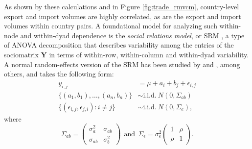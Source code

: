 \documentclass[11pt]{article}\usepackage[]{graphicx}\usepackage[]{color}
\newcommand{\bl}[1]{{\mathbf #1}}
\begin{document}
As shown by these calculations and in Figure \ref{fig:trade_rmvcm}, 
country-level export and import volumes are highly correlated, 
as are the export and import volumes within country pairs. 
A foundational model for analyzing such 
within-node and within-dyad 
 dependence is 
the \emph{social relations model}, or SRM \citep{warner_kenny_stoto_1979}, 
a type of ANOVA decomposition that describes variability among the
 entries of the sociomatrix $\bl Y$ in terms of within-row, 
within-column and within-dyad variability.  
A normal random-effects version of the SRM has been studied by 
\citet{wong_1982} and  \citet{li_loken_2002}, among others, and 
takes the following form:
\begin{align} 
y_{i,j} & = \mu+ a_i + b_j + \epsilon_{i,j} \label{eqn:srm} \\
 \{ (a_1,b_1) ,\ldots, (a_n,b_n) \} &\sim  \text{i.i.d.} \ N(0,\Sigma_{ab})\nonumber  \\
 \{ (\epsilon_{i,j},\epsilon_{j,i}) : i\neq j \} &\sim  \text{i.i.d.} \ N(0,\Sigma_{e}) ,  \nonumber
\end{align}
where 
\[ 
\Sigma_{ab} = \begin{pmatrix} \sigma^2_a & \sigma_{ab} \\ 
    \sigma_{ab} & \sigma_b^2 \end{pmatrix} \ \  \text{and} \ \
\Sigma_\epsilon = \sigma^2_\epsilon \begin{pmatrix}  1 & \rho \\ \rho & 1 \end{pmatrix}. 
\]
\end{document}
